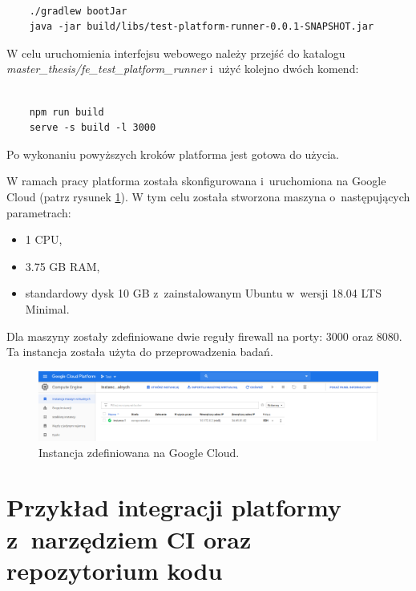 {\selectfont
\tiny
\begin{lstlisting}

    ./gradlew bootJar
    java -jar build/libs/test-platform-runner-0.0.1-SNAPSHOT.jar

\end{lstlisting}
}

W celu uruchomienia interfejsu webowego należy przejść do katalogu \newline \textit{master\_thesis/fe\_test\_platform\_runner} i~użyć kolejno dwóch komend:

{\selectfont
\tiny
\begin{lstlisting}

    npm run build
    serve -s build -l 3000

\end{lstlisting}
}

Po wykonaniu powyższych kroków platforma jest gotowa do użycia.

W ramach pracy platforma została skonfigurowana i~uruchomiona na Google Cloud (patrz rysunek \ref{fig:google_cloud}).
W tym celu została stworzona maszyna o~następujących parametrach:
\begin{itemize}
    \item 1 CPU,
    \item 3.75 GB RAM,
    \item standardowy dysk 10 GB z~zainstalowanym Ubuntu w~wersji 18.04 LTS Minimal.
\end{itemize}
Dla maszyny zostały zdefiniowane dwie reguły firewall na porty: 3000 oraz 8080.
Ta instancja została użyta do przeprowadzenia badań.

\begin{figure}[h]
    \centering
    \includegraphics[width = 12cm]{chapter05/google_cloud.png}
    \caption{Instancja zdefiniowana na Google Cloud.}
    \label{fig:google_cloud}
\end{figure}

\section {Przykład integracji platformy z~narzędziem CI oraz repozytorium kodu}
\label{ci-integration}

